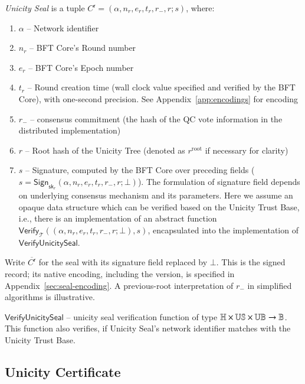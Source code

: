 \emph{Unicity Seal} is a tuple $C^\mathsf{r} = (\alpha, n_r, e_r, t_r, r_-, r; s)$, where:
\begin{enumerate}
	\item $\alpha$ -- Network identifier
	\item $n_r$ -- BFT Core's Round number
	\item $e_r$ -- BFT Core's Epoch number
	\item $t_r$ -- Round creation time (wall clock value specified and verified by the BFT Core), with one-second precision. See Appendix~\ref{app:encodings} for encoding
	\item $r_-$ -- consensus commitment (the hash of the QC vote information in the distributed implementation)
	\item $r$ -- Root hash of the Unicity Tree (denoted as $r^{\text{root}}$ if necessary for clarity)
	\item $s$ -- Signature, computed by the BFT Core over preceding fields ($s = \mathsf{Sign}_{\mathsf{sk}_r}(\alpha,n_r,e_r,t_r,r_-,r;\bot)$). The formulation of signature field depends on underlying consensus mechanism and its parameters. Here we assume an opaque data structure which can be verified based on the Unicity Trust Base, i.e., there is an implementation of an abstract function $\mathsf{Verify}_{\mathcal{T}}((\alpha,n_r,e_r,t_r,r_-,r;\bot),s)$, encapsulated into the implementation of $\mathsf{VerifyUnicitySeal}$.
\end{enumerate}

Write $\overline{C^\mathsf{r}}$ for the seal with its signature field replaced by $\bot$. This is the signed record; its native encoding, including the version, is specified in Appendix~\ref{sec:seal-encoding}. A previous-root interpretation of $r_-$ in simplified algorithms is illustrative.

$\mathsf{VerifyUnicitySeal}$ -- unicity seal verification function of type $\mathbb{H} \times \mathbb{US} \times \mathbb{UB} \to \mathbb{B}$\;. This function also verifies, if Unicity Seal's network identifier matches with the Unicity Trust Base.

\subsection{Unicity Certificate}\label{se:unicity-certificate}

